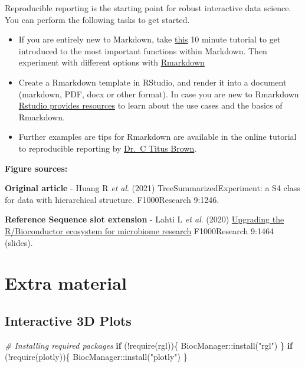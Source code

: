 \documentclass[
]{book}
\newenvironment{Shaded}{\begin{snugshade}}{\end{snugshade}}
\newcommand{\CommentTok}[1]{\textcolor[rgb]{0.56,0.35,0.01}{\textit{#1}}}
\newcommand{\ControlFlowTok}[1]{\textcolor[rgb]{0.13,0.29,0.53}{\textbf{#1}}}
\newcommand{\FunctionTok}[1]{\textcolor[rgb]{0.00,0.00,0.00}{#1}}
\newcommand{\NormalTok}[1]{#1}
\newcommand{\SpecialCharTok}[1]{\textcolor[rgb]{0.00,0.00,0.00}{#1}}
\newcommand{\StringTok}[1]{\textcolor[rgb]{0.31,0.60,0.02}{#1}}
\begin{document}
Reproducible reporting is the starting point for robust interactive
data science. You can perform the following tasks to get started.

\begin{itemize}
\item
  If you are entirely new to Markdown, take
  \href{https://www.markdowntutorial.com/}{this} 10 minute tutorial to get
  introduced to the most important functions within Markdown. Then
  experiment with different options with
  \href{https://www.rstudio.com/wp-content/uploads/2015/02/rmarkdown-cheatsheet.pdf}{Rmarkdown}
\item
  Create a Rmarkdown template in RStudio, and render it into a
  document (markdown, PDF, docx or other format). In case you are new
  to Rmarkdown \href{https://rmarkdown.rstudio.com/lesson-1.html}{Rstudio provides
  resources} to learn
  about the use cases and the basics of Rmarkdown.
\item
  Further examples are tips for Rmarkdown are available in the
  online tutorial to reproducible reporting by \href{https://rpubs.com/marschmi/RMarkdown}{Dr.~C Titus
  Brown}.
\end{itemize}

\textbf{Figure sources:}

\textbf{Original article}
- Huang R \emph{et al}. (2021) TreeSummarizedExperiment: a S4 class
for data with hierarchical structure. F1000Research 9:1246. \citep{Huang2021}

\textbf{Reference Sequence slot extension}
- Lahti L \emph{et al}. (2020) \href{https://doi.org/10.7490/\%20f1000research.1118447.1}{Upgrading the R/Bioconductor ecosystem for microbiome
research} F1000Research 9:1464 (slides).

\hypertarget{extras}{%
\chapter{Extra material}\label{extras}}

\hypertarget{interactive-3d-plots}{%
\section{Interactive 3D Plots}\label{interactive-3d-plots}}

\begin{Shaded}
\begin{Highlighting}[]
\CommentTok{\# Installing required packages}
\ControlFlowTok{if}\NormalTok{ (}\SpecialCharTok{!}\FunctionTok{require}\NormalTok{(rgl))\{}
\NormalTok{  BiocManager}\SpecialCharTok{::}\FunctionTok{install}\NormalTok{(}\StringTok{"rgl"}\NormalTok{)  }
\NormalTok{\}}
\ControlFlowTok{if}\NormalTok{ (}\SpecialCharTok{!}\FunctionTok{require}\NormalTok{(plotly))\{}
\NormalTok{  BiocManager}\SpecialCharTok{::}\FunctionTok{install}\NormalTok{(}\StringTok{"plotly"}\NormalTok{)  }
\NormalTok{\}}
\end{Highlighting}
\end{Shaded}
\end{document}
